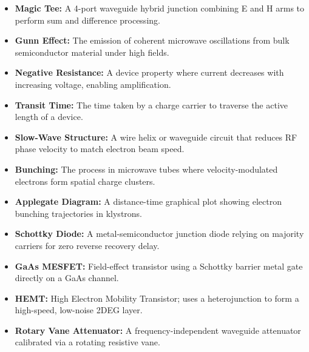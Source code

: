 \documentclass[12pt,a4paper]{article}
\begin{document}
\begin{tcolorbox}[defbox, title={\textbf{One-Line Definitions}}]
\begin{itemize}[leftmargin=*, itemsep=2.5pt, topsep=0pt]
  \item \textbf{Magic Tee:} A 4-port waveguide hybrid junction combining E and H arms to perform sum and difference processing.
  \item \textbf{Gunn Effect:} The emission of coherent microwave oscillations from bulk semiconductor material under high fields.
  \item \textbf{Negative Resistance:} A device property where current decreases with increasing voltage, enabling amplification.
  \item \textbf{Transit Time:} The time taken by a charge carrier to traverse the active length of a device.
  \item \textbf{Slow-Wave Structure:} A wire helix or waveguide circuit that reduces RF phase velocity to match electron beam speed.
  \item \textbf{Bunching:} The process in microwave tubes where velocity-modulated electrons form spatial charge clusters.
  \item \textbf{Applegate Diagram:} A distance-time graphical plot showing electron bunching trajectories in klystrons.
  \item \textbf{Schottky Diode:} A metal-semiconductor junction diode relying on majority carriers for zero reverse recovery delay.
  \item \textbf{GaAs MESFET:} Field-effect transistor using a Schottky barrier metal gate directly on a GaAs channel.
  \item \textbf{HEMT:} High Electron Mobility Transistor; uses a heterojunction to form a high-speed, low-noise 2DEG layer.
  \item \textbf{Rotary Vane Attenuator:} A frequency-independent waveguide attenuator calibrated via a rotating resistive vane.
\end{itemize}
\end{tcolorbox}
\end{document}
